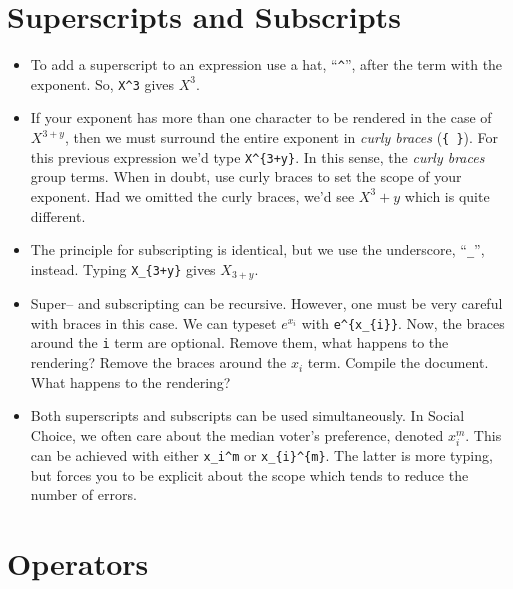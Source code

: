 \section{Superscripts and Subscripts}
\begin{itemize}
\item To add a superscript to an expression use a hat,
  ``\texttt{\^{}}'', after the term with the exponent. So,
  \texttt{X\^{}3} gives $X^3$.

\item If your exponent has more than one character to be rendered in
  the case of $X^{3+y}$, then we must surround the entire exponent in
  \textit{curly braces} (\texttt{\{ \}}). For this previous expression
  we'd type \texttt{X\^{}\{3+y\}}. In this sense, the
  \textit{curly braces} group terms. When in doubt, use curly braces
  to set the scope of your exponent. Had we omitted the curly braces,
  we'd see $X^3+y$ which is quite different.

\item The principle for subscripting is identical, but we use the
  underscore, ``\texttt{\_}'', instead. Typing
  \texttt{X\_{}\{3+y\}} gives $X_{3 + y}$.

\item Super-- and subscripting can be recursive. However, one must be
  very careful with braces in this case. We can typeset $e^{x_{i}}$
  with \texttt{e\^{}\{x\_\{i\}\}}. Now, the braces around the
  \texttt{i} term are optional. Remove them, what happens to the
  rendering? Remove the braces around the $x_i$ term. Compile the
  document. What happens to the rendering?

\item Both superscripts and subscripts can be used simultaneously. In
  Social Choice, we often care about the median voter's preference,
  denoted $x_i^m$. This can be achieved with either
  \texttt{x\_i\^{}m} or \texttt{x\_\{i\}\^{}\{m\}}. The latter
  is more typing, but forces you to be explicit about the scope which
  tends to reduce the number of errors.

\end{itemize}

\section{Operators}

